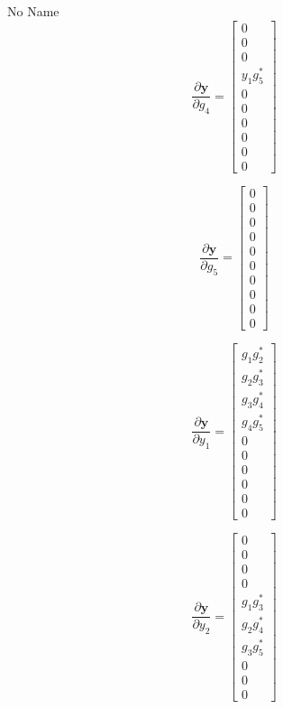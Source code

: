 \documentclass[a4paper,10pt]{article}
\begin{document}
\begin{section}{No Name}
\begin{equation}
\frac{\partial\boldsymbol{y}}{\partial g_4} =  
\begin{bmatrix}
 0\\
 0\\
 0\\
 y_1 g_5^*\\
 0\\
 0\\
 0\\
 0\\
 0\\
 0
\end{bmatrix}
\end{equation}

\begin{equation}
\frac{\partial\boldsymbol{y}}{\partial g_5} =  
\begin{bmatrix}
 0\\
 0\\
 0\\
 0\\
 0\\
 0\\
 0\\
 0\\
 0\\
 0
\end{bmatrix}
\end{equation}

\begin{equation}
\frac{\partial\boldsymbol{y}}{\partial y_1} = 
\begin{bmatrix}
 g_1g_2^*\\
 g_2g_3^*\\
 g_3g_4^*\\
 g_4g_5^*\\
 0\\
 0\\
 0\\
 0\\
 0\\
 0
\end{bmatrix}
\end{equation}


\begin{equation}
\frac{\partial\boldsymbol{y}}{\partial y_2} = 
\begin{bmatrix}
 0\\
 0\\
 0\\
 0\\
 g_1g_3^*\\
 g_2g_4^*\\
 g_3g_5^*\\
 0\\
 0\\
 0
\end{bmatrix}
\end{equation}


\end{section}
\end{document}
